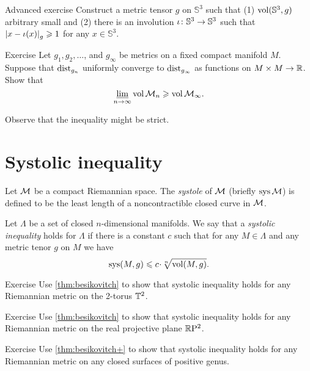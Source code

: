\begin{thm}{Advanced exercise}\label{ex:involution-of-3sphere}
Construct a metric tensor $g$ on $\mathbb{S}^3$ such that (1) $\operatorname{\rm vol}\nolimits(\mathbb{S}^3,g)$ arbitrary small and (2) there is an involution $\iota\:\mathbb{S}^3\z\to \mathbb{S}^3$ such that $\dist{x}{\iota(x)}{g}\ge 1$ for any $x\in \mathbb{S}^3$.
\end{thm}

\begin{thm}{Exercise}\label{ex:GH-vol}
Let $g_1,g_2,\dots$, and $g_\infty$ be metrics on a fixed compact manifold $M$.
Suppose that $\mathrm{dist}_{g_n}$ uniformly converge to $\mathrm{dist}_{g_\infty}$ as functions on $M\times M\to\mathbb{R}$.
Show that 
\[\varliminf_{n\to\infty}\operatorname{\rm vol}\nolimits\mathcal{M}_n\geqslant \operatorname{\rm vol}\nolimits\mathcal{M}_\infty.\]

Observe that the inequality might be strict.
\end{thm}

\section{Systolic inequality}

Let $\mathcal{M}$ be a compact Riemannian space.
The \emph{systole} of $\mathcal{M}$ (briefly $\mathop{\rm sys}\nolimits\mathcal{M}$) is defined to be the least length of a noncontractible closed curve in $\mathcal{M}$.

Let $\Lambda$ be a set of closed $n$-dimensional manifolds.
We say that a \emph{systolic inequality} holds for $\Lambda$ if there is a constant $c$ such that for any $M\in \Lambda$ and any metric tenor $g$ on $M$ we have
\[\sys(M,g)\le c\cdot \sqrt[n]{\vol(M,g)}.\]

\begin{thm}{Exercise}\label{ex:sysT2}
Use \ref{thm:besikovitch} to show that systolic inequality holds for any Riemannian metric on the 2-torus $\mathbb{T}^2$.
\end{thm}

\begin{thm}{Exercise}\label{ex:sysRP2}
Use \ref{thm:besikovitch} to show that systolic inequality holds for any Riemannian metric on  the real projective plane $\mathbb{R}\mathrm{P}^2$.
\end{thm}

\begin{thm}{Exercise}\label{ex:sysSg}
Use \ref{thm:besikovitch+} to show that systolic inequality holds for any Riemannian metric on any closed surfaces of positive genus.
\end{thm}

